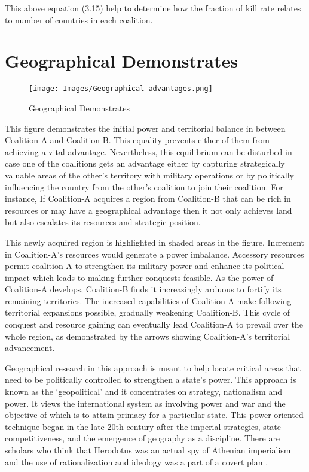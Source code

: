 \documentclass[oneside,12pt]{report}
\begin{document}
This above equation (3.15) help to determine how the fraction of kill rate relates to number of countries in each coalition.


\newpage
\section{Geographical Demonstrates}

\begin{figure} [h]
    \centering
    \texttt{[image: Images/Geographical advantages.png]}
    \caption{Geographical Demonstrates}
    \label{fig:2.1.2}
\end{figure}


This figure demonstrates the initial power and territorial balance in between Coalition A and Coalition B. This equality prevents either of them from achieving a vital advantage.  Nevertheless, this equilibrium can be disturbed in case one of the coalitions gets an advantage either by capturing strategically valuable areas of the other’s territory with military operations or by politically influencing the country from the other’s coalition to join their coalition. For instance, If Coalition-A acquires a region from Coalition-B that can be rich in resources or may have a geographical advantage then it not only achieves land but also escalates its resources and strategic position.

This newly acquired region is highlighted in shaded areas in the figure. Increment in Coalition-A’s resources would generate a power imbalance.  Accessory resources permit coalition-A to strengthen its military power and enhance its political impact which leads to making further conquests feasible. As the power of Coalition-A develops, Coalition-B finds it increasingly arduous to fortify its remaining territories. The increased capabilities of Coalition-A make following territorial expansions possible, gradually weakening Coalition-B. This cycle of conquest and resource gaining can eventually lead Coalition-A to prevail over the whole region, as demonstrated by the arrows showing Coalition-A’s territorial advancement.

Geographical research in this approach is meant to help locate critical areas that need to be politically controlled to strengthen a state’s power. This approach is known as the ‘geopolitical’ and it concentrates on strategy, nationalism and power. It views the international system as involving power and war and the objective of which is to attain primacy for a particular state. This power-oriented technique began in the late 20th century after the imperial strategies, state competitiveness, and the emergence of geography as a discipline. There are scholars who think that Herodotus was an actual spy of Athenian imperialism and the use of rationalization and ideology was a part of a covert plan \cite{r5}.
\end{document}
